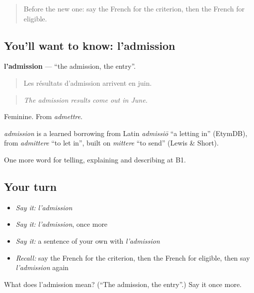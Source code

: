 \begin{quote}
Before the new one: say the French for the criterion, then the French for eligible.
\end{quote}

\subsection*{You'll want to know: l'admission}
\textbf{l'admission} — \textquotedblleft{}the admission, the entry\textquotedblright{}.

\begin{quote}
Les résultats d'admission arrivent en juin.
\end{quote}

\begin{quote}
\emph{The admission results come out in June.}
\end{quote}

Feminine. From \emph{admettre}.

\begin{cousinweb}
\emph{admission} is a learned borrowing from Latin \emph{admissiō} \textquotedblleft{}a letting in\textquotedblright{} (EtymDB), from \emph{admittere} \textquotedblleft{}to let in\textquotedblright{}, built on \emph{mittere} \textquotedblleft{}to send\textquotedblright{} (Lewis \& Short).
\end{cousinweb}

\begin{grammarlens}[title={What you've built}]
One more word for telling, explaining and describing at B1.
\end{grammarlens}

\subsection*{Your turn}
\begin{itemize}
\raggedright
  \item \emph{Say it:} \emph{l'admission}
  \item \emph{Say it:} \emph{l'admission}, once more
  \item \emph{Say it:} a sentence of your own with \emph{l'admission}
  \item \emph{Recall:} say the French for the criterion, then the French for eligible, then say \emph{l'admission} again
\end{itemize}

\begin{tcolorbox}[breakable,colback=teal!4,colframe=teal!35!black,title={Before you move on}]
What does l'admission mean? (\textquotedblleft{}The admission, the entry\textquotedblright{}.) Say it once more.
\end{tcolorbox}
